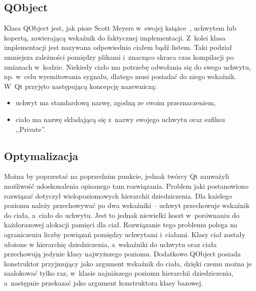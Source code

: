 \subsection{QObject}
Klasa QObject jest, jak pisze Scott Meyers w~swojej książce~\cite[150-158]{50Ways}, uchwytem lub kopertą, zawierającą wskaźnik do faktycznej implementacji. Z~kolei klasa implementacji jest nazywana odpowiednio ciałem bądź listem. Taki podział zmniejsza zależności pomiędzy plikami i~znacząco skraca czas kompilacji po zmianach w~kodzie.
Niekiedy ciało ma potrzebę odwołania się do swego uchwytu, np. w~celu wyemitowania sygnału, dlatego musi posiadać do niego wskaźnik. W~Qt przyjęto następującą koncepcję nazewniczą:
\begin{itemize}
\item{uchwyt ma standardową nazwę, zgodną ze swoim przeznaczeniem,}
\item{ciało ma nazwę składającą się z~nazwy swojego uchwytu oraz sufiksu ,,Private''.}
\end{itemize}

\subsection{Optymalizacja}
Można by poprzestać na poprzednim punkcie, jednak twórcy Qt zauważyli możliwość udoskonalenia opisanego tam rozwiązania.
Problem jaki postanowiono rozwiązać dotyczył wielopoziomowych hierarchii dziedziczenia. 
Dla każdego poziomu należy przechowywać po dwa wskaźniki -- uchwyt przechowuje wskaźnik do ciała, a~ciało do uchwytu. Jest to jednak niewielki koszt w~porównaniu do każdorazowej alokacji pamięci dla ciał.
Rozwiązanie tego problemu polega na ograniczeniu liczby powiązań pomiędzy uchwytami i~ciałami. Klasy ciał zostały ułożone w hierarchię dziedziczenia, a~wskaźniki do uchwytu oraz ciała przechowują jedynie klasy najwyższego poziomu. Dodatkowo QObject posiada konstruktor przyjmujący jako argument wskaźnik do ciała, dzięki czemu można je zaalokować tylko raz, w~klasie najniższego poziomu hierarchii dziedziczenia, a~następnie przekazać jako argument konstruktora klasy bazowej. 



